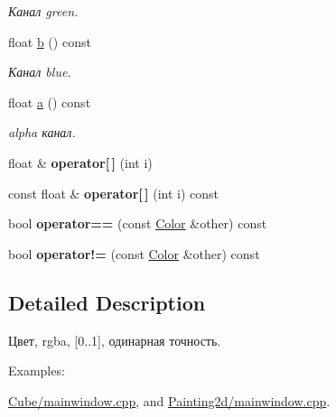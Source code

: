 \begin{DoxyCompactItemize}
\begin{DoxyCompactList}\small\item\em Канал green. \end{DoxyCompactList}\item 
\hypertarget{class_tempest_1_1_color_a3c9641a1dee2770f28c167ff6866158c}{float \hyperlink{class_tempest_1_1_color_a3c9641a1dee2770f28c167ff6866158c}{b} () const }\label{class_tempest_1_1_color_a3c9641a1dee2770f28c167ff6866158c}

\begin{DoxyCompactList}\small\item\em Канал blue. \end{DoxyCompactList}\item 
\hypertarget{class_tempest_1_1_color_ac36ada4151d5898dea335ebf8b1cd21b}{float \hyperlink{class_tempest_1_1_color_ac36ada4151d5898dea335ebf8b1cd21b}{a} () const }\label{class_tempest_1_1_color_ac36ada4151d5898dea335ebf8b1cd21b}

\begin{DoxyCompactList}\small\item\em alpha канал. \end{DoxyCompactList}\item 
\hypertarget{class_tempest_1_1_color_a530574bfdce44ddb000245e06eb8788a}{float \& {\bfseries operator\mbox{[}$\,$\mbox{]}} (int i)}\label{class_tempest_1_1_color_a530574bfdce44ddb000245e06eb8788a}

\item 
\hypertarget{class_tempest_1_1_color_a68ec7fa2525d944737a4288d7125734e}{const float \& {\bfseries operator\mbox{[}$\,$\mbox{]}} (int i) const }\label{class_tempest_1_1_color_a68ec7fa2525d944737a4288d7125734e}

\item 
\hypertarget{class_tempest_1_1_color_a4e3847141a90051eb9db797a82a6aa3a}{bool {\bfseries operator==} (const \hyperlink{class_tempest_1_1_color}{Color} \&other) const }\label{class_tempest_1_1_color_a4e3847141a90051eb9db797a82a6aa3a}

\item 
\hypertarget{class_tempest_1_1_color_a6763dbfc1d7592a1476bee33c98cdf24}{bool {\bfseries operator!=} (const \hyperlink{class_tempest_1_1_color}{Color} \&other) const }\label{class_tempest_1_1_color_a6763dbfc1d7592a1476bee33c98cdf24}

\end{DoxyCompactItemize}


\subsection{Detailed Description}
Цвет, rgba, \mbox{[}0..1\mbox{]}, одинарная точность. \begin{Desc}
\item[Examples\+: ]\par
\hyperlink{_cube_2mainwindow_8cpp-example}{Cube/mainwindow.\+cpp}, and \hyperlink{_painting2d_2mainwindow_8cpp-example}{Painting2d/mainwindow.\+cpp}.\end{Desc}


